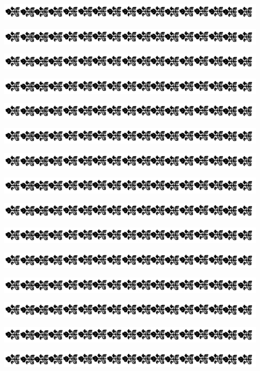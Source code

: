 \documentclass[11pt]{memoir}
\newcommand{\chapdeco}{
	\bigbreak
	{\centering \includegraphics[scale=0.185]{images/en-tete-chapitre.png}}
}
\begin{document}

\newpage %
\chapdeco

\chapdeco

\chapdeco

\chapdeco

\chapdeco

\chapdeco

\newpage %
\chapdeco

\chapdeco

\chapdeco

\chapdeco

\chapdeco

\chapdeco

\chapdeco

\chapdeco

\chapdeco

\newpage

\thispagestyle{empty}
\mbox{}

\renewcommand*\contentsname{\centering\scshape Table des chapitres de ce livre}
\tableofcontents*

\newpage


\end{document}
